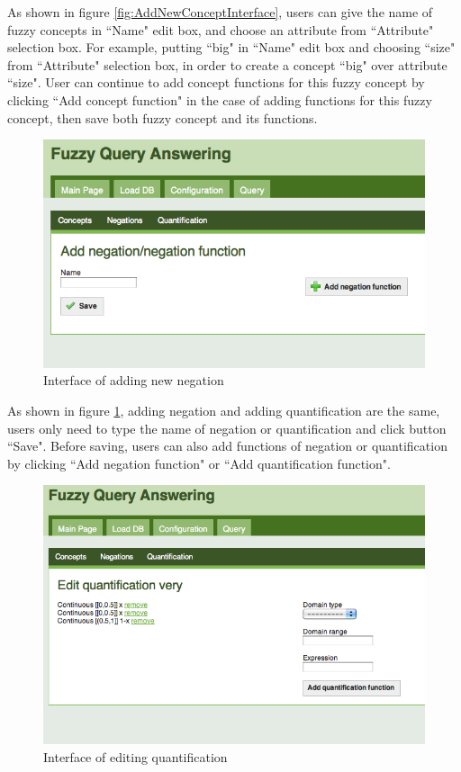 As shown in figure \ref{fig:AddNewConceptInterface}, users can give the name of fuzzy concepts in ``Name" edit box, and choose an attribute from ``Attribute" selection box. For example, putting ``big" in ``Name" edit box and choosing ``size" from ``Attribute" selection box, in order to create a concept ``big" over attribute ``size". User can continue to add concept functions for this fuzzy concept by clicking ``Add concept function" in the case of adding functions for this fuzzy concept, then save both fuzzy concept and its functions. 
\newpage
\begin{figure}[h]
\begin{center}
\includegraphics[scale=0.6]{AddingNewNegation.png}
\end{center}
\caption{Interface of adding new negation}
\label{fig:AddNewNegationInterface}
\end{figure}
As shown in figure \ref{fig:AddNewNegationInterface}, adding negation and adding quantification are the same, users only need to type the name of negation or quantification and click button ``Save". Before saving, users can also add functions of negation or quantification by clicking ``Add negation function" or ``Add quantification function".
 \newpage
\begin{figure}[h]
\begin{center}
\includegraphics[scale=0.6]{EditingQuantification.png}
\end{center}
\caption{Interface of editing quantification}
\label{fig:EditQuantification}
\end{figure}
